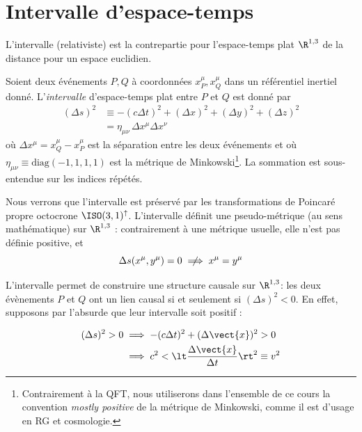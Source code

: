 \section{Intervalle d'espace-temps}

L'intervalle (relativiste) est la contrepartie pour l'espace-temps plat $\R^{1,3}$ de la distance pour un espace euclidien.

\begin{theoremframe}
    \begin{defi}
        Soient deux événements $P,Q$ à coordonnées $x_P^\mu, x_Q^\mu$ dans un référentiel inertiel donné. L'\emph{intervalle} d'espace-temps plat entre $P$ et $Q$ est donné par
        \begin{align}
            (\Delta s)^2 &\equiv -(c\Delta t)^2 + (\Delta x)^2 + (\Delta y)^2 + (\Delta z)^2\\
            &= \eta _{\mu \nu} \, \Delta x^{\mu} \Delta x^{\nu}
        \end{align}
        où $\Delta x^{\mu}=x^\mu_Q-x^\mu_P$ est la séparation entre les deux événements et où $\eta _{\mu \nu} \equiv \textrm{diag}(-1, 1, 1, 1)$ est la métrique de Minkowski\footnote{Contrairement à la QFT, nous utiliserons dans l'ensemble de ce cours la convention \emph{mostly positive} de la métrique de Minkowski, comme il est d'usage en RG et cosmologie.}. La sommation est sous-entendue sur les indices répétés.
    \end{defi}
\end{theoremframe}
Nous verrons que l'intervalle est préservé par les transformations de Poincaré propre octocrone $\ISO (3,1)^\uparrow$. L'intervalle définit une pseudo-métrique (au sens mathématique) sur $\R^{1,3}$ : contrairement à une métrique usuelle, elle n'est pas définie positive, et 
\begin{equation}
    \Delta s(x^\mu,y^\mu)=0 \centernot \implies x^\mu=y^\mu
\end{equation}

L'intervalle permet de construire une structure causale sur $\R^{1,3}$: les deux évènements $P$ et $Q$ ont un lien causal si et seulement si $(\Delta s)^2 < 0$. En effet, supposons par l'absurde que leur intervalle soit positif :

\begin{align}
    (\Delta s)^2 > 0 &\implies -(c\Delta t)^2 + (\Delta \vect{x})^2 > 0\\
    &\implies c^2 < \lt \frac{\Delta \vect{x}}{\Delta t} \rt^2 \equiv v^2\\
\end{align}

